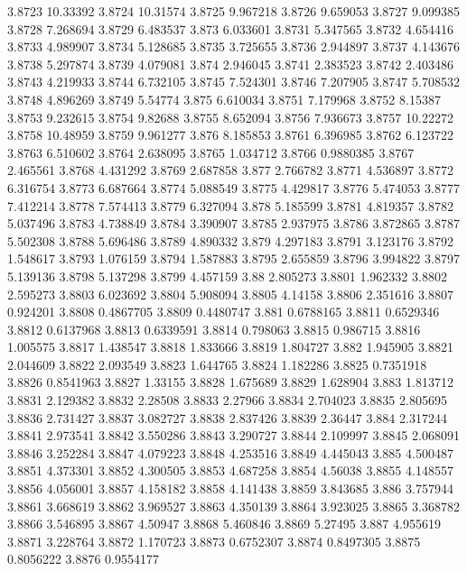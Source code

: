 3.8723  10.33392
3.8724  10.31574
3.8725  9.967218
3.8726  9.659053
3.8727  9.099385
3.8728  7.268694
3.8729  6.483537
3.873  6.033601
3.8731  5.347565
3.8732  4.654416
3.8733  4.989907
3.8734  5.128685
3.8735  3.725655
3.8736  2.944897
3.8737  4.143676
3.8738  5.297874
3.8739  4.079081
3.874  2.946045
3.8741  2.383523
3.8742  2.403486
3.8743  4.219933
3.8744  6.732105
3.8745  7.524301
3.8746  7.207905
3.8747  5.708532
3.8748  4.896269
3.8749  5.54774
3.875  6.610034
3.8751  7.179968
3.8752  8.15387
3.8753  9.232615
3.8754  9.82688
3.8755  8.652094
3.8756  7.936673
3.8757  10.22272
3.8758  10.48959
3.8759  9.961277
3.876  8.185853
3.8761  6.396985
3.8762  6.123722
3.8763  6.510602
3.8764  2.638095
3.8765  1.034712
3.8766  0.9880385
3.8767  2.465561
3.8768  4.431292
3.8769  2.687858
3.877  2.766782
3.8771  4.536897
3.8772  6.316754
3.8773  6.687664
3.8774  5.088549
3.8775  4.429817
3.8776  5.474053
3.8777  7.412214
3.8778  7.574413
3.8779  6.327094
3.878  5.185599
3.8781  4.819357
3.8782  5.037496
3.8783  4.738849
3.8784  3.390907
3.8785  2.937975
3.8786  3.872865
3.8787  5.502308
3.8788  5.696486
3.8789  4.890332
3.879  4.297183
3.8791  3.123176
3.8792  1.548617
3.8793  1.076159
3.8794  1.587883
3.8795  2.655859
3.8796  3.994822
3.8797  5.139136
3.8798  5.137298
3.8799  4.457159
3.88  2.805273
3.8801  1.962332
3.8802  2.595273
3.8803  6.023692
3.8804  5.908094
3.8805  4.14158
3.8806  2.351616
3.8807  0.924201
3.8808  0.4867705
3.8809  0.4480747
3.881  0.6788165
3.8811  0.6529346
3.8812  0.6137968
3.8813  0.6339591
3.8814  0.798063
3.8815  0.986715
3.8816  1.005575
3.8817  1.438547
3.8818  1.833666
3.8819  1.804727
3.882  1.945905
3.8821  2.044609
3.8822  2.093549
3.8823  1.644765
3.8824  1.182286
3.8825  0.7351918
3.8826  0.8541963
3.8827  1.33155
3.8828  1.675689
3.8829  1.628904
3.883  1.813712
3.8831  2.129382
3.8832  2.28508
3.8833  2.27966
3.8834  2.704023
3.8835  2.805695
3.8836  2.731427
3.8837  3.082727
3.8838  2.837426
3.8839  2.36447
3.884  2.317244
3.8841  2.973541
3.8842  3.550286
3.8843  3.290727
3.8844  2.109997
3.8845  2.068091
3.8846  3.252284
3.8847  4.079223
3.8848  4.253516
3.8849  4.445043
3.885  4.500487
3.8851  4.373301
3.8852  4.300505
3.8853  4.687258
3.8854  4.56038
3.8855  4.148557
3.8856  4.056001
3.8857  4.158182
3.8858  4.141438
3.8859  3.843685
3.886  3.757944
3.8861  3.668619
3.8862  3.969527
3.8863  4.350139
3.8864  3.923025
3.8865  3.368782
3.8866  3.546895
3.8867  4.50947
3.8868  5.460846
3.8869  5.27495
3.887  4.955619
3.8871  3.228764
3.8872  1.170723
3.8873  0.6752307
3.8874  0.8497305
3.8875  0.8056222
3.8876  0.9554177
